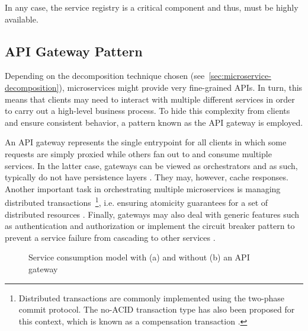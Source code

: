 In any case, the service registry is a critical component and thus, must be highly available.


\subsection{\acs*{API} Gateway Pattern}
\label{sec:api-gateway-pattern}

Depending on the decomposition technique chosen (see~\autoref{sec:microservice-decomposition}), microservices might provide very fine-grained \acsp{API}. In turn, this means that clients may need to interact with multiple different services in order to carry out a high-level business process. To hide this complexity from clients and ensure consistent behavior, a pattern known as the \acs{API} gateway is employed.

An \acs{API} gateway represents the single entrypoint for all clients in which some requests are simply proxied while others fan out to and consume multiple services. In the latter case, gateways can be viewed as orchestrators and as such, typically do not have persistence layers \cite[p.~585]{villamizar2015evaluating}. They may, however, cache responses. Another important task in orchestrating multiple microservices is managing distributed transactions~\footnote{Distributed transactions are commonly implemented using the two-phase commit protocol. The no-\acs{ACID} transaction type has also been proposed for this context, which is known as a compensation transaction \cite[p.~32]{cerny2018contextual}.}, i.e. ensuring atomicity guarantees for a set of distributed resources \cite[p.~32]{cerny2018contextual}. Finally, gateways may also deal with generic features such as authentication and authorization or implement the circuit breaker pattern to prevent a service failure from cascading to other services \cite[p.~41]{kalske2017challenges} \cite[p.~37]{messina2016simplified}.

\begin{figure}[htp]
    \centering
    \qquad

    \caption[Service consumption model with and without an \acs*{API} gateway]{Service consumption model with (a) and without (b) an \acs*{API} gateway \cite{netflix2013api}}
    \label{fig:api-gateway-pattern}
\end{figure}

